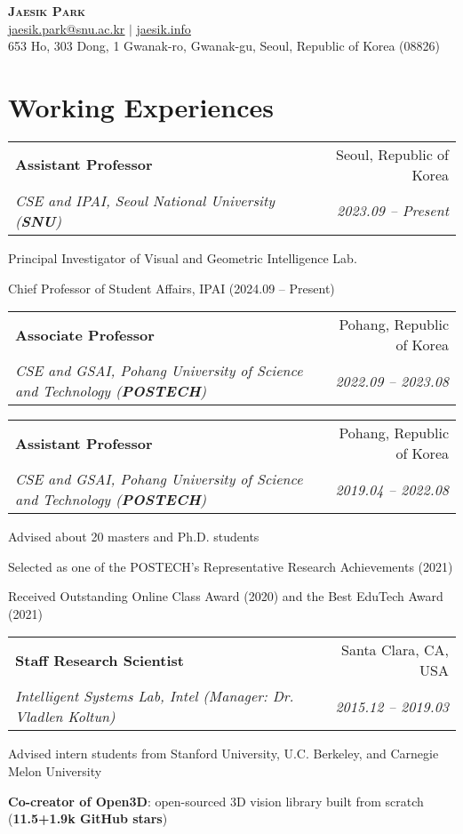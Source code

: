 \documentclass[letterpaper,11pt]{article}
\makeatletter
\newcommand{\resumeItem}[1]{
  \small{
  \item{#1 \vspace{-2pt}}
  }
}
\newcommand{\resumeSubheading}[4]{
  \vspace{-2pt}\item
    \begin{tabular*}{0.97\textwidth}[t]{l@{\extracolsep{\fill}}r}
      \textbf{#1} & #2 \\
      \textit{\small#3} & \textit{\small #4} \\
    \end{tabular*}\vspace{-7pt}
}
\newcommand{\resumeSubHeadingListStart}{\begin{itemize}[leftmargin=0.15in, label={}]}
\newcommand{\resumeSubHeadingListEnd}{\end{itemize}}
\newcommand{\resumeItemListStart}{\begin{itemize}}
\newcommand{\resumeItemListEnd}{\end{itemize}\vspace{-5pt}}
\makeatother
\begin{document}
\begin{center}
    \textbf{\Huge \scshape Jaesik Park} \\ \vspace{3pt}
    \small \href{mailto:jaesik.park@snu.ac.kr}{\underline{jaesik.park@snu.ac.kr}} $|$ 
    \href{http://jaesik.info}{\underline{jaesik.info}}\\
    \footnotesize{653 Ho, 303 Dong, 1 Gwanak-ro, Gwanak-gu, Seoul, Republic of Korea (08826)}
\end{center}

\section{Working Experiences}
  \resumeSubHeadingListStart
    \resumeSubheading
      {Assistant Professor}{Seoul, Republic of Korea}
      {CSE and IPAI, Seoul National University \textnormal{(\textbf{SNU})}}{2023.09 -- Present}
      \resumeItemListStart
        \resumeItem{Principal Investigator of Visual and Geometric Intelligence Lab.}
        \resumeItem{Chief Professor of Student Affairs, IPAI (2024.09 -- Present)}
      \resumeItemListEnd
    \resumeSubheading
      {Associate Professor}{Pohang, Republic of Korea}
      {CSE and GSAI, Pohang University of Science and Technology \textnormal{(\textbf{POSTECH})}}{2022.09 -- 2023.08}
    \resumeSubheading
      {Assistant Professor}{Pohang, Republic of Korea}
      {CSE and GSAI, Pohang University of Science and Technology \textnormal{(\textbf{POSTECH})}}{2019.04 -- 2022.08}
      \resumeItemListStart
        \resumeItem{Advised about 20 masters and Ph.D. students}
        \resumeItem{Selected as one of the POSTECH's Representative Research Achievements (2021)}
        \resumeItem{Received Outstanding Online Class Award (2020) and the Best EduTech Award (2021)}
      \resumeItemListEnd
    \resumeSubheading
      {Staff Research Scientist}{Santa Clara, CA, USA}
      {Intelligent Systems Lab, Intel (Manager: Dr. Vladlen Koltun)}{2015.12 -- 2019.03}
        \resumeItemListStart
          \resumeItem{Advised intern students from Stanford University, U.C. Berkeley, and Carnegie Melon University}
          \resumeItem{\textbf{Co-creator of Open3D}: open-sourced 3D vision library built from scratch (\textbf{11.5+1.9k GitHub stars})}
        \resumeItemListEnd
  \resumeSubHeadingListEnd
\end{document}
